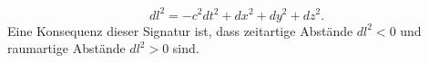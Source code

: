 \begin{equation}
	dl^2 = -c^2dt^2 +dx^2+dy^2+dz^2.
\end{equation}
Eine Konsequenz dieser Signatur ist, dass zeitartige Abstände $dl^2 < 0$ und raumartige Abstände $dl^2 > 0$ sind.
\begin{comment}
\subsection{Herleitung Hodge-Duale (Verweis auf Abschnitt im Buch)}
Wir verwenden die Definition des Hodge-Operators
\begin{equation*}
	\alpha \wedge \ast \beta = \langle \alpha, \beta \rangle \operatorname{vol}(M),
\end{equation*}
wobei \( \langle \cdot , \cdot \rangle \) das durch die Metrik \( g^{ik} \) induzierte Skalarprodukt ist.
Im Folgenden führen wir die Berechnungen der Hodge-Dualen für 1-, 2- und 3-Formen im Minkowski-Raum mit $(-+++)$-Signatur durch. Dabei gilt gemäß Gleichung~\eqref{maxwell:section:teil1:metrik}
\[
g^{ik} = \begin{pmatrix}
	-1 & 0 & 0 & 0 \\ 0 & 1 & 0 & 0 \\ 0 & 0 & 1 & 0 \\ 0 & 0 & 0 & 1 
\end{pmatrix},
\qquad
\operatorname{vol}(M) = dx^0 \wedge dx^1 \wedge dx^2 \wedge dx^3.
\]

\vspace{1em}
\noindent
Um die Notation kompakter und übersichtlicher zu gestalten, führen wir die folgende Kurzschreibweise für antisymmetrische Produkte von Basisformen ein:
\begin{align*}
	dx^{ij} &:= dx^i \wedge dx^j, \\
	dx^{ijk} &:= dx^i \wedge dx^j \wedge dx^k.
\end{align*}
Dabei gehen wir stets von aufsteigend sortierten Indizes \( i < j < k \) aus.


\end{comment}
